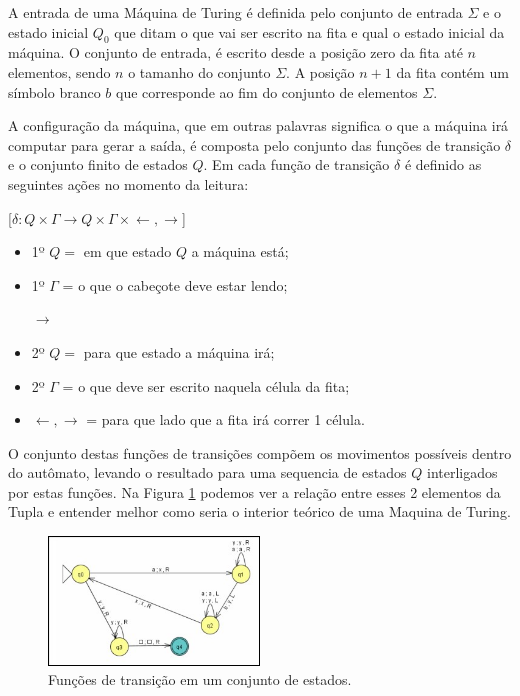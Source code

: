 \documentclass[
	article,			%
	11pt,				%
	oneside,			%
	a4paper,			%
	english,			%
	brazil,				%
	sumario=tradicional
	]{abntex2}
\begin{document}
    A entrada de uma Máquina de Turing é definida pelo conjunto de entrada $\Sigma$ e o estado inicial $Q_0$ que ditam o que vai ser escrito na fita e qual o estado inicial da máquina.  O conjunto de entrada, é escrito desde a posição zero da fita até $n$ elementos, sendo $n$ o tamanho do conjunto $\Sigma$. A posição $n+1$ da fita contém um símbolo branco $b$ que corresponde ao fim do conjunto de elementos $\Sigma$. 
    
	A configuração da máquina, que em outras palavras significa o que a máquina irá computar para gerar a saída, é composta pelo conjunto das funções de transição $\delta$ e o conjunto finito de estados $Q$. Em cada função de transição $\delta$ é definido as seguintes ações no momento da leitura:
	
    	[${\delta : Q\times \Gamma } \longrightarrow  Q\times \Gamma \times {\leftarrow ,\rightarrow}$]
    	
    \begin{itemize}
        \item 1º $Q = $ em que estado $Q$ a máquina está;
        \item 1º $\Gamma$ = o que o cabeçote deve estar lendo;
        
        $\longrightarrow$
        
        \item 2º $Q = $ para que estado a máquina irá;
		\item 2º $\Gamma$ = o que deve ser escrito naquela célula da fita;
		\item ${\leftarrow ,\rightarrow}$ = para que lado que a fita irá correr 1 célula.
			
	\end{itemize}
	
    O conjunto destas funções de transições compõem os movimentos possíveis dentro do autômato, levando o resultado para uma sequencia de estados $Q$ interligados por estas funções. Na Figura \ref{fig:funcao_de_transicao} podemos ver a relação entre esses 2 elementos da Tupla e entender melhor como seria o interior teórico de uma Maquina de Turing.
        
\begin{figure}
\centering
\includegraphics[width=0.5\textwidth]{funcao_de_transicao.jpg}
\caption{\label{fig:funcao_de_transicao}Funções de transição em um conjunto de estados.}
\end{figure}
\end{document}
